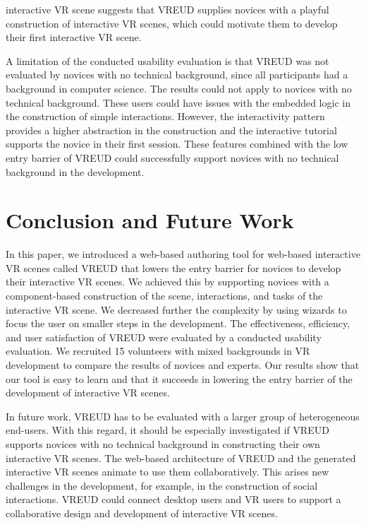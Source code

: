 \documentclass[conference]{IEEEtran}
\begin{document}
interactive \ac{VR} scene suggests that VREUD supplies novices with a playful construction of interactive \ac{VR} scenes, which could motivate them to develop their first interactive VR scene.  

A limitation of the conducted usability evaluation is that VREUD was not evaluated by novices with no technical background, since all participants had a background in computer science. The results could not apply to novices with no technical background. These users could have issues with the embedded logic in the construction of simple interactions. However, the interactivity pattern provides a higher abstraction in the construction and the interactive tutorial supports the novice in their first session. These features combined with the low entry barrier of VREUD could successfully support novices with no technical background in the development.   

\section{Conclusion and Future Work}
In this paper, we introduced a web-based authoring tool for web-based interactive \ac{VR} scenes called VREUD that lowers the entry barrier for novices to develop their interactive \ac{VR} scenes. We achieved this by supporting novices with a component-based construction of the scene, interactions, and tasks of the interactive \ac{VR} scene. We decreased further the complexity by using wizards to focus the user on smaller steps in the development. The effectiveness, efficiency, and user satisfaction of VREUD were evaluated by a conducted usability evaluation. We recruited 15 volunteers with mixed backgrounds in \ac{VR} development to compare the results of novices and experts. Our results show that our tool is easy to learn and that it succeeds in lowering the entry barrier of the development of interactive \ac{VR} scenes.

In future work, VREUD has to be evaluated with a larger group of heterogeneous end-users. With this regard, it should be especially investigated if VREUD supports novices with no technical background in constructing their own interactive VR scenes. The web-based architecture of VREUD and the generated interactive VR scenes animate to use them collaboratively. This arises new challenges in the development, for example, in the construction of social interactions. VREUD could connect desktop users and VR users to support a collaborative design and development of interactive VR scenes. 



\newpage
\end{document}
